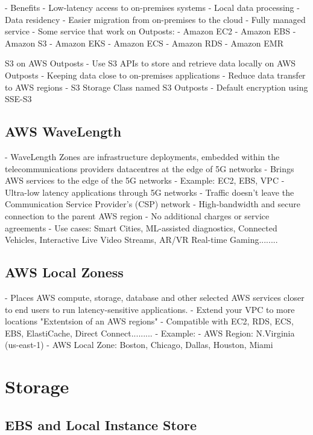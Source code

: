 \documentclass[11pt]{book}
\begin{document}
    - Benefits
        - Low-latency access to on-premises systems
        - Local data processing
        - Data residency
        - Easier migration from on-premises to the cloud
        - Fully managed service
    - Some service that work on Outposts:
        - Amazon EC2
        - Amazon EBS
        - Amazon S3
        - Amazon EKS
        - Amazon ECS
        - Amazon RDS
        - Amazon EMR

    S3 on AWS Outposts
    - Use S3 APIs to store and retrieve data locally on AWS Outposts
    - Keeping data close to on-premises applications
    - Reduce data transfer to AWS regions
    - S3 Storage Class named S3 Outposts
    - Default encryption using SSE-S3

    \section{AWS WaveLength}
    - WaveLength Zones are infrastructure deployments, embedded within the telecommunications providers datacentres at the edge of 5G networks
    - Brings AWS services to the edge of the 5G networks
    - Example: EC2, EBS, VPC
    - Ultra-low latency applications through 5G networks
    - Traffic doesn't leave the Communication Service Provider's (CSP) network
    - High-bandwidth and secure connection to the parent AWS region
    - No additional charges or service agreements
    - Use cases: Smart Cities, ML-assisted diagnostics, Connected Vehicles, Interactive Live Video Streams, AR/VR Real-time Gaming........ %

    \section{AWS Local Zoness}
    - Places AWS compute, storage, database and other selected AWS services closer to end users to run latency-sensitive applications.
    - Extend your VPC to more locations "Extentsion of an AWS regions"
    - Compatible with EC2, RDS, ECS, EBS, ElastiCache, Direct Connect.........
    - Example:
        - AWS Region: N.Virginia (us-east-1)
        - AWS Local Zone: Boston, Chicago, Dallas, Houston, Miami

    \chapter{Storage}


    \section{EBS and Local Instance Store}
\end{document}

